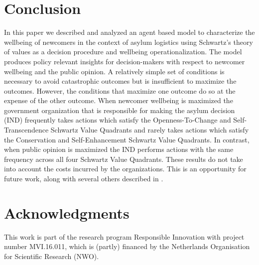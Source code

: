 \documentclass{scspaperproc}
\theoremstyle{scsthe}
\begin{document}

\section{Conclusion}
\label{sec:discussion}
In this paper we described and analyzed an agent based model to characterize the wellbeing of newcomers in the context of asylum logistics using Schwartz's theory of values as a decision procedure and wellbeing operationalization. The model produces policy relevant insights for decision-makers with respect to newcomer wellbeing and the public opinion. A relatively simple set of conditions is necessary to avoid catastrophic outcomes but is insufficient to maximize the outcomes. However, the conditions that maximize one outcome do so at the expense of the other outcome. When newcomer wellbeing is maximized the  government organization that is responsible for making the asylum decision (IND) frequently takes actions which satisfy the Openness-To-Change and Self-Transcendence Schwartz Value Quadrants and rarely takes actions which satisfy the Conservation and Self-Enhancement Schwartz Value Quadrants. In contrast, when public opinion is maximized the IND performs actions with the same frequency across all four Schwartz Value Quadrants. These results do not take into account the costs incurred by the organizations. This is an opportunity for future work, along with several others described in \cite{phil.masters.thesis}. 
\section*{Acknowledgments}
This work is part of the research program Responsible Innovation with project number MVI.16.011, which is (partly) financed by the Netherlands Organisation for Scientific Research (NWO). %


\end{document}
